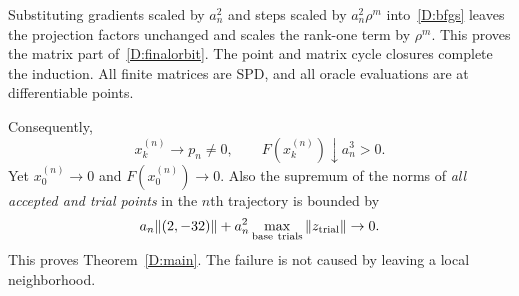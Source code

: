 Substituting gradients scaled by $a_n^2$ and steps scaled by $a_n^2\rho^m$ into~\eqref{D:bfgs} leaves the projection factors unchanged and scales the rank-one term by $\rho^m$. This proves the matrix part of~\eqref{D:finalorbit}. The point and matrix cycle closures complete the induction. All finite matrices are SPD, and all oracle evaluations are at differentiable points.

Consequently,
\[
 x_k^{(n)}\to p_n\ne0,\qquad
 F(x_k^{(n)})\downarrow a_n^3>0.
\]
Yet $x_0^{(n)}\to0$ and $F(x_0^{(n)})\to0$. Also the supremum of the norms of \emph{all accepted and trial points} in the $n$th trajectory is bounded by
\[
 a_n\|(2,-32)\|+a_n^2\max_{\rm base\ trials}\|z_{\rm trial}\|\to0.
\]
This proves Theorem~\ref{D:main}. The failure is not caused by leaving a local neighborhood.


\endgroup
